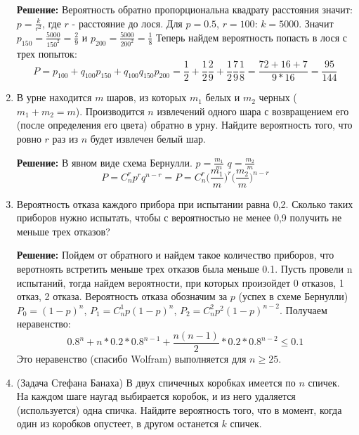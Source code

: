 \documentclass[a4paper, 14pt]{extarticle}
\begin{document}
\begin{enumerate}
\textbf{Решение:}
    Вероятность обратно пропорциональна квадрату расстояния значит: $p = \frac{k}{r^2}$, где $r$ - расстояние до лося. Для $p = 0.5$, $r=100$: $k=5000$. Значит 
    $p_{150} = \frac{5000}{150^2} = \frac{2}{9}$ и 
    $p_{200} = \frac{5000}{200^2} = \frac{1}{8}$
    \newline
    Теперь найдем вероятность попасть в лося с трех попыток:
    $$P = p_{100} + q_{100}p_{150} + q_{100}q_{150}p_{200} = \frac{1}{2} + \frac{1}{2}\frac{2}{9} + \frac{1}{2}\frac{7}{9}\frac{1}{8} = \frac{72+16+7}{9*16} = \frac{95}{144}$$

\item В урне находится $m$ шаров, из которых $m_1$ белых и $m_2$ черных
($m_1 + m_2 = m$). Производится $n$ извлечений одного шара с возвращением его (после определения его цвета) обратно в урну. Найдите
вероятность того, что ровно $r$ раз из $n$ будет извлечен белый шар.

\textbf{Решение:}
В явном виде схема Бернулли. $p =\frac{m_1}{m}$ $q =\frac{m_2}{m}$
$$P = C_n^r p^r q^{n-r} = P = C_n^r \Big(\frac{m_1}{m}\Big)^r \Big(\frac{m_2}{m}\Big)^{n-r}$$

\item Вероятность отказа каждого прибора при испытании
	равна 0,2. Сколько таких приборов нужно испытать, чтобы с
	вероятностью не менее 0,9 получить не меньше трех отказов?

\textbf{Решение:} 
Пойдем от обратного и найдем такое количество приборов, что веротноять встретить меньше трех отказов была меньше 0.1. Пусть провели n испытаний, тогда найдем вероятности, при которых произойдет 0 отказов, 1 отказ, 2 отказа. Вероятность отказа обозначим за $p$ (успех в схеме Бернулли)
$P_0 = (1-p)^n$, $P_1 = C_n^1p(1-p)^n$, $P_2 = C_n^2 p^2 (1-p)^{n-2}$. Получаем неравенство:
$$0.8^n + n*0.2*0.8^{n-1} + \frac{n(n-1)}{2}*0.2*0.8^{n-2} \le 0.1$$
Это неравенство (спасибо Wolfram) выполняется для $n\ge 25$.

\item (Задача Стефана Банаха) В двух спичечных коробках
имеется по $n$ спичек. На каждом шаге наугад выбирается коробок, и из него удаляется (используется) одна спичка. Найдите вероятность того, что в момент, когда один из коробков опустеет, в другом останется $k$ спичек.



\end{enumerate}
\end{document}
